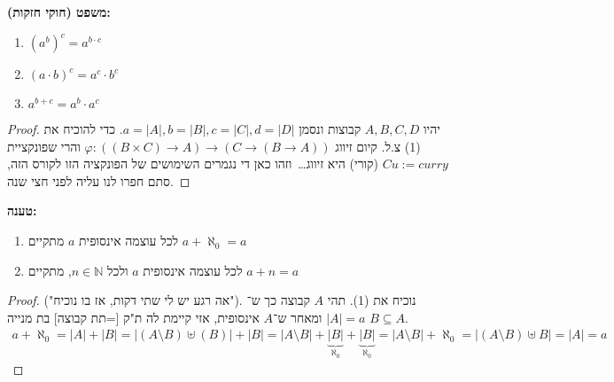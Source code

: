 \documentclass[]{article}
\newcommand\N     {\mathbb{N}}
\newcommand\vphi  {\varphi}
\newcommand\az    {\aleph_0}
\begin{document}
	\textbf{משפט (חוקי חזקות): }
	\begin{enumerate}
		\item $ (a^b)^c = a^{b \cdot c} $
		\item $ (a \cdot b)^c = a^c \cdot b^c $
		\item $ a^{b + c} = a^b \cdot a^c $
	\end{enumerate}
	\begin{proof}
		יהיו $ A, B, C, D $ קבוצות ונסמן $ a = |A|, b = |B|, c = |C|, d = |D| $. כדי להוכיח את (1) צ.ל. קיום זיווג $ \vphi \colon ((B \times C) \to A) \to (C \to (B \to A)) $ והרי שפונקציית $ Cu := curry $ (קורי) היא זיווג\dots \ וזהו כאן די נגמרים השימושים של הפונקציה הזו לקורס הזה, סתם חפרו לנו עליה לפני חצי שנה. 
	\end{proof}
	\textbf{טענה: }
	\begin{enumerate}
		\item לכל עוצמה אינסופית $ a $ מתקיים $ a + \az = a $
		\item לכל עוצמה אינסופית $ a $ ולכל $ n \in \N $, מתקיים $ a + n = a $
	\end{enumerate}
	\begin{proof}
		("אה רגע יש לי שתי דקות, אז בו נוכיח"). נוכיח את (1). תהי $ A $ קבוצה כך ש־$ |A| = a $ ומאחר ש־$ A $ אינסופית, אזי קיימת לה ת"ק [=תת קבוצה] בת מנייה $ B \subseteq A $. 
		\begin{align*}
			a + \az = |A| + |B| = |(A \setminus B) \uplus (B)| + |B| = |A \setminus B| + \underbrace{|B|}_{\az} + \underbrace{|B|}_{\az} = |A \setminus B| + \az = |(A \setminus B) \uplus B| = |A| = a
		\end{align*}
	\end{proof}
\end{document}
